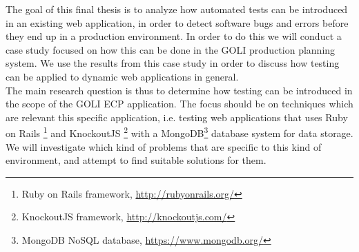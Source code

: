 
The goal of this final thesis is to analyze how automated tests can be
introduced in an existing web application, in order to detect software
bugs and errors before they end up in a production environment. In order
to do this we will conduct a case study focused on how this can be done
in the GOLI production planning system. We use the results from this
case study in order to discuss how testing can be applied to dynamic
web applications in general.\\

The main research question is thus to determine how testing can be
introduced in the scope of the GOLI ECP application. The focus should
be on techniques which are relevant this specific application, i.e.
testing web applications that uses Ruby on Rails
\footnote{Ruby on Rails framework, \url{http://rubyonrails.org/}}
and KnockoutJS
\footnote{KnockoutJS framework, \url{http://knockoutjs.com/}} with a
MongoDB\footnote{MongoDB NoSQL database, \url{https://www.mongodb.org/}}
database system for data storage. We will investigate which kind of
problems that are specific to this kind of environment, and attempt to
find suitable solutions for them.\\
